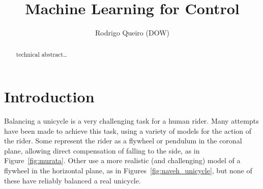 \documentclass{IIBproject}
\begin{document}
\author{Rodrigo Queiro (DOW)}
\title{Machine Learning for Control}
\maketitle
\thispagestyle{empty}

\renewcommand{\abstractname}{Technical Abstract}
\begin{abstract}
  technical abstract\ldots
\end{abstract}
\pagestyle{plain}
\tableofcontents
\newpage

\section{Introduction}

Balancing a unicycle is a very challenging task for a
human rider. Many attempts have been made to achieve this task, using a
variety of models for the action of the rider. Some represent the rider as a
flywheel or pendulum in the coronal plane, allowing direct compensation of
falling to the side\cite{ref:zenkov,ref:murata}, as in
Figure~\ref{fig:murata}. Other use a more realistic (and challenging) model of
a flywheel in the horizontal plane\cite{ref:vos,ref:naveh}, as in
Figures~\ref{fig:naveh_unicycle}, but none of these
have reliably balanced a real unicycle.
\end{document}

